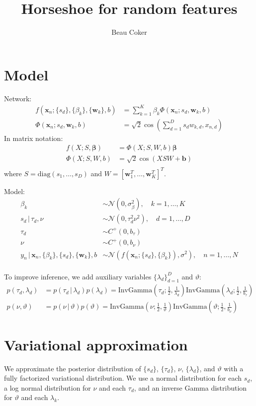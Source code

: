 \documentclass[11pt, oneside]{article}   	%
\title{Horseshoe for random features}
\author{Beau Coker}
\date{}							%
\def \bbeta {\bm{\beta}}
\def \x {\mathbf{x}}
\def \w {\mathbf{w}}
\def \b {\mathbf{b}}
\newcommand{\given}{\,|\,}
\begin{document}
\maketitle


\section{Model}

Network:
\begin{align}
f(\x_n; \{s_d\}, \{\beta_k\}, \{\w_k\}, b ) &=\sum_{k=1}^K \beta_k \Phi(\x_n; s_d, \w_k, b ) \\
\Phi(\x_n; s_d, \w_k, b) &= \sqrt{2}\cos\left(  \sum_{d=1}^D s_d w_{k,d}, x_{n,d} \right)
\end{align}
In matrix notation:
\begin{align}
f(X; S, \bbeta) &= \Phi(X; S, W, b)\bbeta \\
\Phi(X; S, W, b) &= \sqrt{2}\cos(X S W + \b) \\
\end{align}
where $S=\text{diag}(s_1,\dotsc,s_D)$ and $W=[\w_1^T,\dotsc,\w_K^T]^T$.

Model:
\begin{align}
\beta_k &\sim \mathcal{N}(0, \sigma^2_\beta), \quad k=1,\dotsc,K \\
s_d \given \tau_d, \nu &\sim \mathcal{N}(0, \tau_d^2 \nu^2), \quad d=1,\dotsc,D \\
\tau_d &\sim C^+(0, b_\tau)\ \\
\nu &\sim C^+(0, b_\nu) \\
y_n \given \x_n, \{\beta_k\}, \{s_d\}, \{\w_k\}, b &\sim \mathcal{N}(f(\x_n; \{s_d\}, \{\beta_k\}), \sigma^2), \quad n=1,\dotsc,N \\
\end{align}

To improve inference, we add auxiliary variables $\{ \lambda_d \}_{d=1}^D$ and $\vartheta$:
\begin{align}
p(\tau_d, \lambda_d) &= p(\tau_d \given \lambda_d) p(\lambda_d)= \text{InvGamma}\left(\tau_d;  \frac{1}{2}, \frac{1}{\lambda_d}\right)  \text{InvGamma}\left(\lambda_d; \frac{1}{2}, \frac{1}{b_\tau}\right)
\\
p(\nu, \vartheta) &= p(\nu \given \vartheta) p(\vartheta) = \text{InvGamma}\left(\nu;  \frac{1}{2}, \frac{1}{\vartheta}\right)  \text{InvGamma}\left(\vartheta; \frac{1}{2}, \frac{1}{b_\nu}\right)
\end{align}

\section{Variational approximation}
We approximate the posterior distribution of $\{s_d\}$, $\{\tau_d\}$, $\nu$, $\{\lambda_d\}$, and $\vartheta$ with a fully factorized variational distribution. We use a normal distribution for each $s_d$, a log normal distribution for $\nu$ and each $\tau_d$, and an inverse Gamma distribution for $\vartheta$ and each $\lambda_k$.
\end{document}
